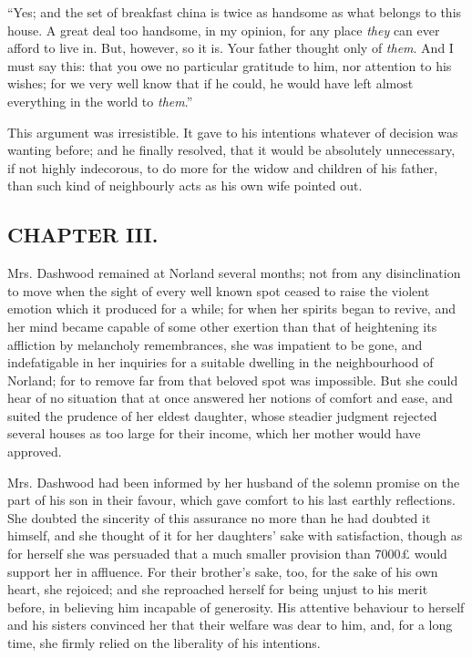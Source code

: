 “Yes; and the set of breakfast china is twice as handsome as what belongs to this house. A great deal too handsome, in my opinion, for any place {\em they} can ever afford to live in. But, however, so it is. Your father thought only of {\em them}. And I must say this: that you owe no particular gratitude to him, nor attention to his wishes; for we very well know that if he could, he would have left almost everything in the world to {\em them}.”

This argument was irresistible. It gave to his intentions whatever of decision was wanting before; and he finally resolved, that it would be absolutely unnecessary, if not highly indecorous, to do more for the widow and children of his father, than such kind of neighbourly acts as his own wife pointed out.

\subsection[chapter-iii.]{\useURL[url3][][][]\from[url3]CHAPTER III.}

Mrs. Dashwood remained at Norland several months; not from any disinclination to move when the sight of every well known spot ceased to raise the violent emotion which it produced for a while; for when her spirits began to revive, and her mind became capable of some other exertion than that of heightening its affliction by melancholy remembrances, she was impatient to be gone, and indefatigable in her inquiries for a suitable dwelling in the neighbourhood of Norland; for to remove far from that beloved spot was impossible. But she could hear of no situation that at once answered her notions of comfort and ease, and suited the prudence of her eldest daughter, whose steadier judgment rejected several houses as too large for their income, which her mother would have approved.

Mrs. Dashwood had been informed by her husband of the solemn promise on the part of his son in their favour, which gave comfort to his last earthly reflections. She doubted the sincerity of this assurance no more than he had doubted it himself, and she thought of it for her daughters' sake with satisfaction, though as for herself she was persuaded that a much smaller provision than 7000£ would support her in affluence. For their brother's sake, too, for the sake of his own heart, she rejoiced; and she reproached herself for being unjust to his merit before, in believing him incapable of generosity. His attentive behaviour to herself and his sisters convinced her that their welfare was dear to him, and, for a long time, she firmly relied on the liberality of his intentions.

